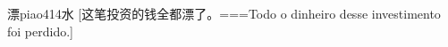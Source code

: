 \begin{EntryWithPhonetic}{漂}{piao4}{14}{⽔}
  [这笔投资的钱全都漂了。===Todo o dinheiro desse investimento foi perdido.]
\end{EntryWithPhonetic}

